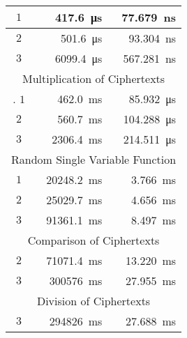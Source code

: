 \documentclass{article}
\begin{document}
\begin{center}
\begin{tabular}{| c | r | r |}
                $1$ & \SI{417.6}{\micro\second} & \SI{77.679}{\nano\second}
                \\ \hline
                $2$ & \SI{501.6}{\micro\second} & \SI{93.304}{\nano\second}
                \\ \hline
                $3$ & \SI{6099.4}{\micro\second} & \SI{567.281}{\nano\second}
                \\ \hline
                \multicolumn{3}{|c|}{Multiplication of Ciphertexts}
                \\ \hline.
                $1$ & \SI{462.0}{\milli\second} & \SI{85.932}{\micro\second}
                \\ \hline
                $2$ & \SI{560.7}{\milli\second} & \SI{104.288}{\micro\second}
                \\ \hline
                $3$ & \SI{2306.4}{\milli\second} & \SI{214.511}{\micro\second}
                \\ \hline
                \multicolumn{3}{|c|}{Random Single Variable Function}
                \\ \hline
                $1$ & \SI{20248.2}{\milli\second} & \SI{3.766}{\milli\second}
                \\ \hline
                $2$ & \SI{25029.7}{\milli\second} & \SI{4.656}{\milli\second}
                \\ \hline
                $3$ & \SI{91361.1}{\milli\second} & \SI{8.497}{\milli\second}
                \\ \hline
                \multicolumn{3}{|c|}{Comparison of Ciphertexts}
                \\ \hline
                $2$ & \SI{71071.4}{\milli\second} & \SI{13.220}{\milli\second}
                \\ \hline
                $3$ & \SI{300576}{\milli\second} & \SI{27.955}{\milli\second}
                \\ \hline
                \multicolumn{3}{|c|}{Division of Ciphertexts}
                \\ \hline
                $3$ & \SI{294826}{\milli\second} & \SI{27.688}{\milli\second}
                \\ \hline
            \end{tabular}
        \end{center}
\end{document}
